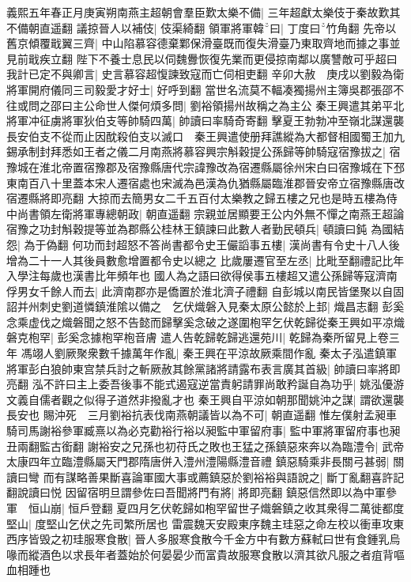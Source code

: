 義熙五年春正月庚寅朔南燕主超朝會羣臣歎太樂不備|{
	三年超獻太樂伎于秦故歎其不備朝直遥翻}
議掠晉人以補伎|{
	伎渠綺翻}
領軍將軍韓曰|{
	丁度曰竹角翻}
先帝以舊京傾覆戢翼三齊|{
	中山陷慕容德棄鄴保滑臺既而復失滑臺乃東取齊地而據之事並見前戢疾立翻}
陛下不養士息民以伺魏釁恢復先業而更侵掠南鄰以廣讐敵可乎超曰我計已定不與卿言|{
	史言慕容超愎諫致寇而亡伺相吏翻}
辛卯大赦　庚戌以劉毅為衛將軍開府儀同三司毅愛才好士|{
	好呼到翻}
當世名流莫不輻凑獨揚州主簿吳郡張邵不往或問之邵曰主公命世人傑何煩多問|{
	劉裕領揚州故稱之為主公}
秦王興遣其弟平北將軍冲征虜將軍狄伯支等帥騎四萬|{
	帥讀曰率騎奇寄翻}
擊夏王勃勃冲至嶺北謀還襲長安伯支不從而止因酖殺伯支以滅口　秦王興遣使册拜譙縱為大都督相國蜀王加九錫承制封拜悉如王者之儀二月南燕將慕容興宗斛穀提公孫歸等帥騎寇宿豫拔之|{
	宿豫城在淮北帝置宿豫郡及宿豫縣唐代宗諱豫改為宿遷縣屬徐州宋白曰宿豫城在下邳東南百八十里蓋本宋人遷宿處也宋滅為邑漢為仇猶縣屬臨淮郡晉安帝立宿豫縣唐改宿遷縣將即亮翻}
大掠而去簡男女二千五百付太樂教之歸五樓之兄也是時五樓為侍中尚書領左衛將軍專總朝政|{
	朝直遥翻}
宗親並居顯要王公内外無不憚之南燕王超論宿豫之功封斛穀提等並為郡縣公桂林王鎮諫曰此數人者勤民頓兵|{
	頓讀曰鈍}
為國結怨|{
	為于偽翻}
何功而封超怒不答尚書都令史王儼謟事五樓|{
	漢尚書有令史十八人後增為二十一人其後員數愈增置都令史以總之}
比歲屢遷官至左丞|{
	比毗至翻禮記比年入學注每歲也漢書比年頻年也}
國人為之語曰欲得侯事五樓超又遣公孫歸等寇濟南俘男女千餘人而去|{
	此濟南郡亦是僑置於淮北濟子禮翻}
自彭城以南民皆堡聚以自固詔并州刺史劉道憐鎮淮隂以備之　乞伏熾磐入見秦太原公懿於上邽|{
	熾昌志翻}
彭奚念乘虚伐之熾磐聞之怒不告懿而歸擊奚念破之遂圍枹罕乞伏乾歸從秦王興如平凉熾磐克枹罕|{
	彭奚念據枹罕枹音膚}
遣人告乾歸乾歸逃還苑川|{
	乾歸為秦所留見上卷三年}
馮翊人劉厥聚衆數千據萬年作亂|{
	秦王興在平涼故厥乘間作亂}
秦太子泓遣鎮軍將軍彭白狼帥東宫禁兵討之斬厥赦其餘黨諸將請露布表言廣其首級|{
	帥讀曰率將即亮翻}
泓不許曰主上委吾後事不能式遏寇逆當責躬請罪尚敢矜誕自為功乎|{
	姚泓優游文義自儒者觀之似得子道然非撥亂才也}
秦王興自平涼如朝那聞姚沖之謀|{
	謂欲還襲長安也}
賜沖死　三月劉裕抗表伐南燕朝議皆以為不可|{
	朝直遥翻}
惟左僕射孟昶車騎司馬謝裕參軍臧熹以為必克勸裕行裕以昶監中軍留府事|{
	監中軍將軍留府事也昶丑兩翻監古銜翻}
謝裕安之兄孫也初苻氏之敗也王猛之孫鎮惡來奔以為臨澧令|{
	武帝太康四年立臨澧縣屬天門郡隋唐併入澧州澧陽縣澧音禮}
鎮惡騎乘非長關弓甚弱|{
	關讀曰彎}
而有謀略善果斷喜論軍國大事或薦鎮惡於劉裕裕與語說之|{
	斷丁亂翻喜許記翻說讀曰悦}
因留宿明旦謂參佐曰吾聞將門有將|{
	將即亮翻}
鎮惡信然即以為中軍參軍　恒山崩|{
	恒戶登翻}
夏四月乞伏乾歸如枹罕留世子熾磐鎮之收其衆得二萬徙都度堅山|{
	度堅山乞伏之先司繁所居也}
雷震魏天安殿東序魏主珪惡之命左校以衝車攻東西序皆毁之初珪服寒食散|{
	晉人多服寒食散今千金方中有數方蘇軾曰世有食鍾乳烏喙而縱酒色以求長年者蓋始於何晏晏少而富貴故服寒食散以濟其欲凡服之者疽背嘔血相踵也}
